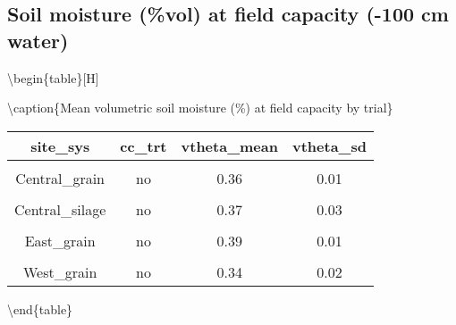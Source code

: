 \documentclass[
]{article}
\begin{document}
\hypertarget{soil-moisture-vol-at-field-capacity--100-cm-water}{%
\subsection{Soil moisture (\%vol) at field capacity (-100 cm
water)}\label{soil-moisture-vol-at-field-capacity--100-cm-water}}

\textbackslash begin\{table\}{[}H{]}

\textbackslash caption\{\label{tab:fc}Mean volumetric soil moisture (\%)
at field capacity by trial\} \centering

\begin{tabular}[t]{cccc}
\toprule
site\_sys & cc\_trt & vtheta\_mean & vtheta\_sd\\
\midrule
\cellcolor{gray!6}{Central\_grain} & \cellcolor{gray!6}{cc} & \cellcolor{gray!6}{0.35} & \cellcolor{gray!6}{0.01}\\
\cmidrule{1-4}
Central\_grain & no & 0.36 & 0.01\\
\cmidrule{1-4}
\cellcolor{gray!6}{Central\_silage} & \cellcolor{gray!6}{cc} & \cellcolor{gray!6}{0.39} & \cellcolor{gray!6}{0.03}\\
\cmidrule{1-4}
Central\_silage & no & 0.37 & 0.03\\
\cmidrule{1-4}
\cellcolor{gray!6}{East\_grain} & \cellcolor{gray!6}{cc} & \cellcolor{gray!6}{0.38} & \cellcolor{gray!6}{0.03}\\
\cmidrule{1-4}
East\_grain & no & 0.39 & 0.01\\
\cmidrule{1-4}
\cellcolor{gray!6}{West\_grain} & \cellcolor{gray!6}{cc} & \cellcolor{gray!6}{0.34} & \cellcolor{gray!6}{0.04}\\
\cmidrule{1-4}
West\_grain & no & 0.34 & 0.02\\
\bottomrule
\end{tabular}

\textbackslash end\{table\}
\end{document}
